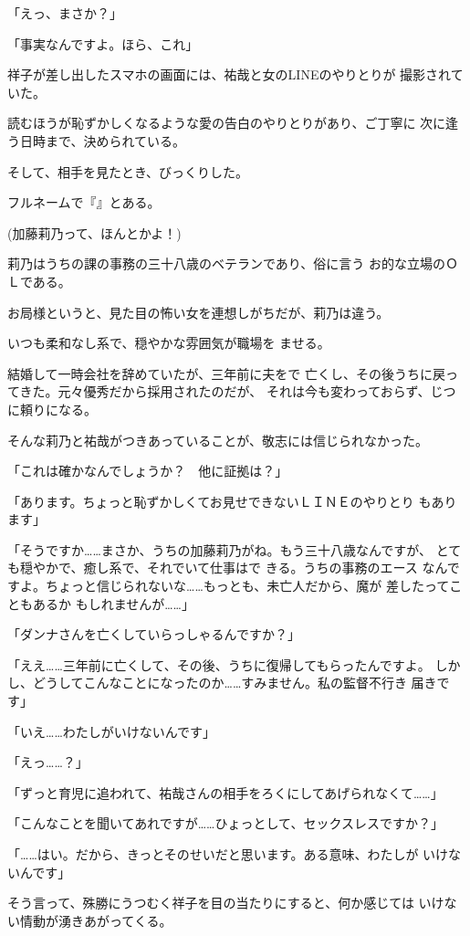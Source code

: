 ﻿\documentclass[
    book,tate,
    line_length=30zw,
    jafontsize=12pt,
    paper=b5j,
    landscape,
    ]{jlreq}
\begin{document}
「えっ、まさか？」

「事実なんですよ。ほら、これ」

祥子が差し出したスマホの画面には、祐哉と女のLINEのやりとりが
撮影されていた。

読むほうが恥ずかしくなるような愛の告白のやりとりがあり、ご丁寧に
次に逢う日時まで、決められている。

そして、相手を見たとき、びっくりした。

フルネームで『』とある。

(加藤莉乃って、ほんとかよ！)

莉乃はうちの課の事務の三十八歳のベテランであり、俗に言う
お的な立場のＯＬである。

お局様というと、見た目の怖い女を連想しがちだが、莉乃は違う。

いつも柔和なし系で、穏やかな雰囲気が職場を
ませる。

結婚して一時会社を辞めていたが、三年前に夫をで
亡くし、その後うちに戻ってきた。元々優秀だから採用されたのだが、
それは今も変わっておらず、じつに頼りになる。

そんな莉乃と祐哉がつきあっていることが、敬志には信じられなかった。

「これは確かなんでしょうか？　他に証拠は？」

「あります。ちょっと恥ずかしくてお見せできないＬＩＮＥのやりとり
もあります」

「そうですか……まさか、うちの加藤莉乃がね。もう三十八歳なんですが、
とても穏やかで、癒し系で、それでいて仕事はで きる。うちの事務のエース
なんですよ。ちょっと信じられないな……もっとも、未亡人だから、魔が
差したってこともあるか もしれませんが……」

「ダンナさんを亡くしていらっしゃるんですか？」

「ええ……三年前に亡くして、その後、うちに復帰してもらったんですよ。
しかし、どうしてこんなことになったのか……すみません。私の監督不行き
届きです」

「いえ……わたしがいけないんです」

「えっ……？」

「ずっと育児に追われて、祐哉さんの相手をろくにしてあげられなくて……」

「こんなことを聞いてあれですが……ひょっとして、セックスレスですか？」

「……はい。だから、きっとそのせいだと思います。ある意味、わたしが
いけないんです」

そう言って、殊勝にうつむく祥子を目の当たりにすると、何か感じては
いけない情動が湧きあがってくる。
\end{document}
